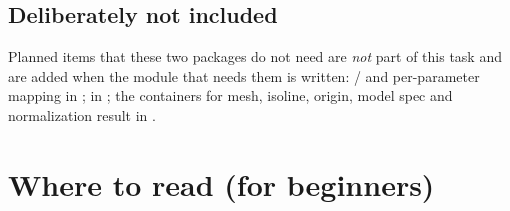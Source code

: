 \documentclass{article}
\begin{document}
\subsection*{Deliberately not included}

Planned items that these two packages do not need are \emph{not} part of this
task and are added when the module that needs them is written:
/ and per-parameter mapping in ;
 in ; the containers for mesh, isoline,
origin, model spec and normalization result in .

\section{Where to read (for beginners)}
\end{document}
